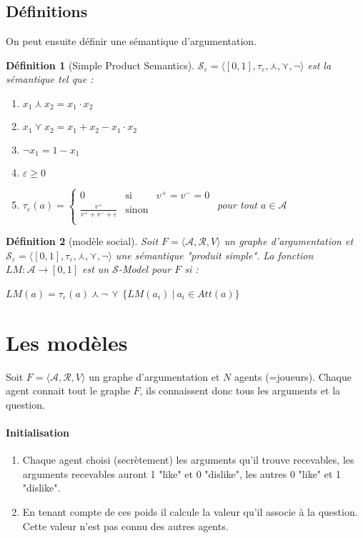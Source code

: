 \documentclass[12pt]{article}
\theoremstyle{defi}
\newtheorem{definition}{Définition}
\theoremstyle{not}
\theoremstyle{prob}
\begin{document}
  \subsection{Définitions}
    On peut ensuite définir une sémantique d'argumentation.
    \begin{definition}[Simple Product Semantics]
      $\mathcal{S}_\varepsilon = \langle [0, 1], \tau_\varepsilon, \curlywedge, \curlyvee, \neg  \rangle$ est la sémantique tel que :
      \begin{enumerate}
        \item $x_1 \curlywedge x_2 = x_1 \cdot x_2$
        \item $x_1 \curlyvee x_2 = x_1 + x_2 - x_1 \cdot x_2$
        \item $\neg x_1 = 1 - x_1$
        \item $\varepsilon \geq 0$
        \item $\tau_\varepsilon(a) = \left\{
          \begin{array}{lll}
            0 & \mbox{si } & v^+ = v^- = 0\\
            \frac{v^+}{v^+ + v^- + \varepsilon} & \mbox{sinon} & \\
          \end{array}\right.$ pour tout $a \in \mathcal{A}$
      \end{enumerate}

    \end{definition}

\begin{definition}[modèle social]
  Soit $F= \langle \mathcal{A}, \mathcal{R}, V \rangle$ un graphe d'argumentation et $\mathcal{S}_\varepsilon = \langle [0, 1], \tau_\varepsilon, \curlywedge, \curlyvee, \neg  \rangle$ une sémantique "produit simple".
  La fonction $LM : \mathcal{A} \rightarrow [0, 1]$ est un $\mathcal{S}$-Model pour $F$ si :

  $LM(a) = \tau_\varepsilon(a) \curlywedge \neg$ {\Large $\curlyvee$} $\{LM(a_i)\ |\ a_i \in Att(a)\}$
\end{definition}

\section{Les modèles}
  Soit $F = \langle \mathcal{A}, \mathcal{R}, V \rangle$ un graphe d'argumentation et $N$ agents (=joueurs). Chaque agent connait tout le graphe $F$, ils connaissent donc tous les arguments et la question.

  \paragraph{Initialisation}
  \begin{enumerate}
    \item Chaque agent choisi (secrètement) les arguments qu'il trouve recevables, les arguments recevables auront 1 "like" et 0 "dislike", les autres 0 "like" et 1 "dislike".

    \item En tenant compte de ces poids il calcule la valeur qu'il associe à la question. Cette valeur n'est pas connu des autres agents.
  \end{enumerate}
\end{document}
